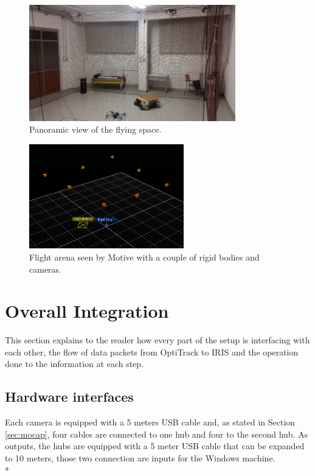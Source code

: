 \begin{figure}[h]
\centering
 \includegraphics[width=0.8\textwidth]{panoramic.png}
 \caption[Flight arena panoramic]{Panoramic view of the flying space.}
 \label{figure:arenapano}
\end{figure}

\begin{figure}[h]
	\centering
	\includegraphics[width=0.6\textwidth]{motiv_panorama.PNG}
	\caption[Flight arena from motive]{Flight arena seen by Motive with a couple of rigid bodies and cameras.}
	\label{figure:arenamotive}
\end{figure}



\section{Overall Integration}
\label{sec:integration}

This section explains to the reader how every part of the setup is interfacing with each other, the flow of data packets from OptiTrack to IRIS and the operation done to the information at each step.

\subsection{Hardware interfaces}

Each camera is equipped with a 5 meters USB cable and, as stated in Section \ref{sec:mocap}, four cables are connected to one hub and four to the second hub. As outputs, the hubs are equipped with a 5 meter USB cable that can be expanded to 10 meters, those two connection are inputs for the Windows machine. \\*

